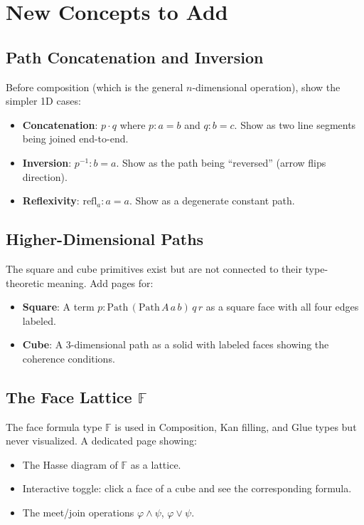 \documentclass[11pt, a4paper]{article}
\begin{document}
\section{New Concepts to Add}

\subsection{Path Concatenation and Inversion}

Before composition (which is the general $n$-dimensional operation), show the
simpler 1D cases:
\begin{itemize}
  \item \textbf{Concatenation}: $p \cdot q$ where $p : a = b$ and $q : b = c$.
    Show as two line segments being joined end-to-end.
  \item \textbf{Inversion}: $p^{-1} : b = a$.
    Show as the path being ``reversed'' (arrow flips direction).
  \item \textbf{Reflexivity}: $\mathrm{refl}_a : a = a$.
    Show as a degenerate constant path.
\end{itemize}

\subsection{Higher-Dimensional Paths}

The square and cube primitives exist but are not connected to their type-theoretic
meaning. Add pages for:
\begin{itemize}
  \item \textbf{Square}: A term $p : \mathrm{Path}\,(\mathrm{Path}\,A\,a\,b)\,q\,r$
    as a square face with all four edges labeled.
  \item \textbf{Cube}: A 3-dimensional path as a solid with labeled faces showing
    the coherence conditions.
\end{itemize}

\subsection{The Face Lattice $\mathbb{F}$}

The face formula type $\mathbb{F}$ is used in Composition, Kan filling, and Glue
types but never visualized. A dedicated page showing:
\begin{itemize}
  \item The Hasse diagram of $\mathbb{F}$ as a lattice.
  \item Interactive toggle: click a face of a cube and see the corresponding formula.
  \item The meet/join operations $\varphi \land \psi$, $\varphi \lor \psi$.
\end{itemize}
\end{document}
